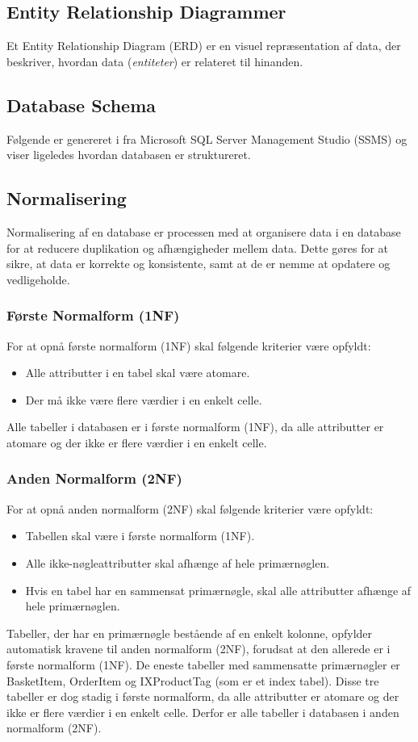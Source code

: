 \subsection{Entity Relationship Diagrammer}
Et Entity Relationship Diagram (ERD) er en visuel repræsentation af data, der beskriver, hvordan data (\emph{entiteter}) er relateret til hinanden.

\subsection{Database Schema}
Følgende er genereret i fra Microsoft SQL Server Management Studio (SSMS) og viser ligeledes hvordan databasen er struktureret.

\subsection{Normalisering}
\label{sec:normalisering}
Normalisering af en database er processen med at organisere data i en database for at reducere duplikation og afhængigheder mellem data. 
Dette gøres for at sikre, at data er korrekte og konsistente, samt at de er nemme at opdatere og vedligeholde.

\subsubsection{Første Normalform (1NF)}
For at opnå første normalform (1NF) skal følgende kriterier være opfyldt:
\begin{itemize}
    \item Alle attributter i en tabel skal være atomare.
    \item Der må ikke være flere værdier i en enkelt celle.
\end{itemize}
Alle tabeller i databasen er i første normalform (1NF), da alle attributter er atomare og der ikke er flere værdier i en enkelt celle.

\subsubsection{Anden Normalform (2NF)}
For at opnå anden normalform (2NF) skal følgende kriterier være opfyldt:
\begin{itemize}
    \item Tabellen skal være i første normalform (1NF).
    \item Alle ikke-nøgleattributter skal afhænge af hele primærnøglen.
    \item Hvis en tabel har en sammensat primærnøgle, skal alle attributter afhænge af hele primærnøglen.
\end{itemize}
Tabeller, der har en primærnøgle bestående af en enkelt kolonne, opfylder automatisk kravene til anden normalform (2NF), forudsat at den allerede er i første normalform (1NF).
De eneste tabeller med sammensatte primærnøgler er BasketItem, OrderItem og IXProductTag (som er et index tabel).
Disse tre tabeller er dog stadig i første normalform, da alle attributter er atomare og der ikke er flere værdier i en enkelt celle.
Derfor er alle tabeller i databasen i anden normalform (2NF).

